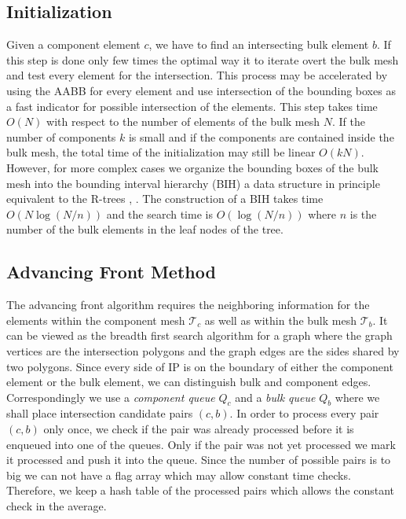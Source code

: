 \subsection{Initialization}
\label{sec:initialization}
Given a component element $c$, we have to find an intersecting bulk element $b$.
If this step is done only few times the optimal way it to iterate overt the bulk mesh and test every element for the intersection.
This process may be accelerated by using the AABB for every element and use intersection of the bounding boxes
as a fast indicator for possible intersection of the elements. This step takes time $O(N)$ with respect to the number of elements of the bulk mesh $N$.
If the number of components $k$ is small and if the components are contained inside the bulk mesh, the total time of the initialization 
may still be linear $O(kN)$. However, for more complex cases we organize the bounding boxes of the bulk mesh into the bounding interval
hierarchy (BIH) \cite{wachter_instant_2006} a data structure in principle equivalent 
to the R-trees \cite{guttman_r_trees_1984}, \cite{nam_comparative_2004}. The construction of a BIH takes time $O(N\log(N/n))$ 
and the search time is $O(\log(N/n))$ where $n$ is the number of the bulk elements in the leaf nodes of the tree.
 
\subsection{Advancing Front Method}
\label{sec:front}
The advancing front algorithm requires the neighboring information for the elements within the component mesh $\mathcal T_c$ 
as well as within the bulk mesh $\mathcal T_b$. It can be viewed as the breadth first search algorithm for a graph where the graph vertices are 
the intersection polygons and the graph edges are the sides shared by two polygons. Since every side of IP is on the boundary of either 
the component element or the bulk element, we can distinguish bulk and component edges. 
Correspondingly we use a \emph{component queue} $Q_c$ and a \emph{bulk queue} $Q_b$ where we shall place intersection candidate pairs $(c,b)$.
In order to process every pair $(c,b)$ only once, we check if the pair was already processed before it is enqueued into one of the queues.
Only if the pair was not yet processed we mark it processed and push it into the queue. Since the number of possible pairs is to big we can not have a flag array
which may allow constant time checks. Therefore, we keep a hash table of the processed pairs which allows the constant check in the average.

